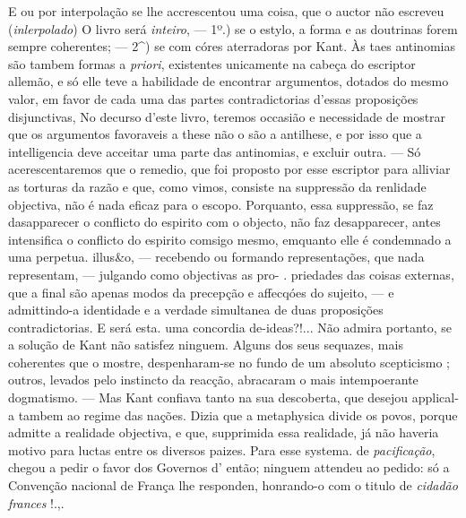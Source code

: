E ou por interpolação se lhe accrescentou uma coisa, que o auctor não escreveu (\emph{inlerpolado}) O livro será \emph{inteiro}, --- 1º.) se o estylo, a forma e as doutrinas forem sempre coherentes; --- 2\textasciicircum{}) se com córes aterradoras por Kant. Às taes antinomias são tambem formas a \emph{priori}, existentes unicamente na cabeça do escriptor allemão, e só elle teve a habilidade de encontrar argumentos, dotados do mesmo valor, em favor de cada uma das partes contradictorias d'essas proposições disjunctivas, No decurso d'este livro, teremos occasião e necessidade de mostrar que os argumentos favoraveis a these não o são a antilhese, e por isso que a intelligencia deve acceitar uma parte das antinomias, e excluir outra. --- Só acerescentaremos que o remedio, que foi proposto por esse escriptor para alliviar as torturas da razão e que, como vimos, consiste na suppressão da renlidade objectiva, não é nada eficaz para o escopo. Porquanto, essa suppressão, se faz dasapparecer o conflicto do espirito com o objecto, não faz desapparecer, antes intensifica o conflicto do espirito comsigo mesmo, emquanto elle é condemnado a uma perpetua. illus\&o, --- recebendo ou formando representações, que nada representam, --- julgando como objectivas as pro- . priedades das coisas externas, que a final são apenas modos da precepção e affecqóes do sujeito, --- e admittindo-a identidade e a verdade simultanea de duas proposições contradictorias. E será esta. uma concordia de-ideas?!... Não admira portanto, se a solução de Kant não satisfez ninguem. Alguns dos seus sequazes, mais coherentes que o mostre, despenharam-se no fundo de um absoluto scepticismo ; outros, levados pelo instincto da reacção, abracaram o mais intempoerante dogmatismo. --- Mas Kant confiava tanto na sua descoberta, que desejou applical-a tambem ao regime das nações. Dizia que a metaphysica divide os povos, porque admitte a realidade objectiva, e que, supprimida essa realidade, já não haveria motivo para luctas entre os diversos paizes. Para esse systema. de \emph{pacificação}, chegou a pedir o favor dos Governos d' então; ninguem attendeu ao pedido: só a Convenção nacional de França lhe responden, honrando-o com o titulo de \emph{cidadão frances} !.,.

